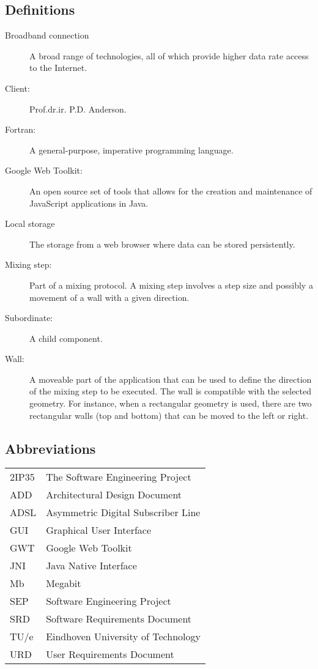 \subsection{Definitions}
\begin{description}
\item[Broadband connection] A broad range of technologies, all of which provide higher data rate access to the Internet.
\item[Client:] Prof.dr.ir. P.D. Anderson.
\item[Fortran:] A general-purpose, imperative programming language.
\item[Google Web Toolkit:] An open source set of tools that allows for the creation and maintenance of JavaScript applications in Java.
\item[Local storage] The storage from a web browser where data can be stored persistently.
\item[Mixing step:] Part of a mixing protocol. A mixing step involves a step size and possibly a movement of a wall with a given direction.
\item[Subordinate:] A child component.
\item[Wall:] A moveable part of the application that can be used to define the direction of the mixing step to be executed. The wall is compatible with the selected geometry. For instance, when a rectangular geometry is used, there are two rectangular walls (top and bottom) that can be moved to the left or right.
\end{description}

\subsection{Abbreviations}
\begin{tabular}{l|l}
2IP35 & The Software Engineering Project \\
ADD & Architectural Design Document \\
ADSL & Asymmetric Digital Subscriber Line \\
GUI & Graphical User Interface \\
GWT & Google Web Toolkit \\
JNI & Java Native Interface \\
Mb & Megabit \\
SEP   & Software Engineering Project \\
SRD   & Software Requirements Document \\
TU/e  & Eindhoven University of Technology \\
URD   & User Requirements Document \\
\end{tabular}

